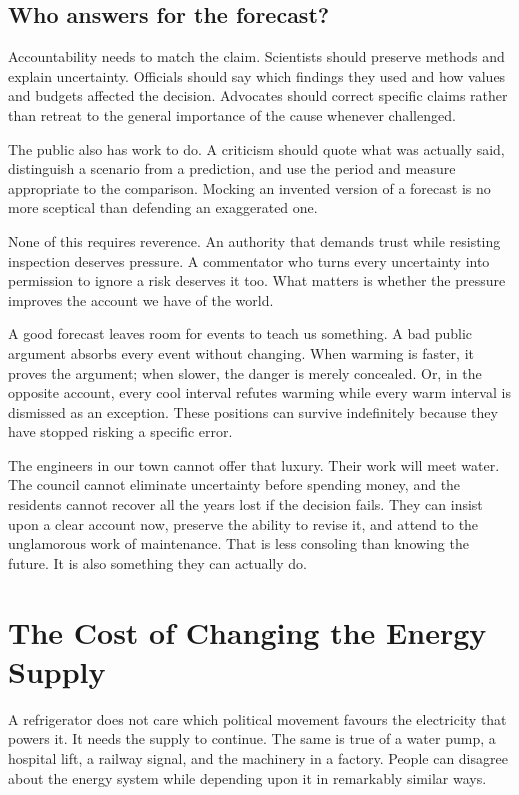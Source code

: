 \documentclass[12pt,a4paper]{book}
\begin{document}
\section*{Who answers for the forecast?}

Accountability needs to match the claim. Scientists should preserve methods and explain uncertainty. Officials should say which findings they used and how values and budgets affected the decision. Advocates should correct specific claims rather than retreat to the general importance of the cause whenever challenged.

The public also has work to do. A criticism should quote what was actually said, distinguish a scenario from a prediction, and use the period and measure appropriate to the comparison. Mocking an invented version of a forecast is no more sceptical than defending an exaggerated one.

None of this requires reverence. An authority that demands trust while resisting inspection deserves pressure. A commentator who turns every uncertainty into permission to ignore a risk deserves it too. What matters is whether the pressure improves the account we have of the world.

A good forecast leaves room for events to teach us something. A bad public argument absorbs every event without changing. When warming is faster, it proves the argument; when slower, the danger is merely concealed. Or, in the opposite account, every cool interval refutes warming while every warm interval is dismissed as an exception. These positions can survive indefinitely because they have stopped risking a specific error.

The engineers in our town cannot offer that luxury. Their work will meet water. The council cannot eliminate uncertainty before spending money, and the residents cannot recover all the years lost if the decision fails. They can insist upon a clear account now, preserve the ability to revise it, and attend to the unglamorous work of maintenance. That is less consoling than knowing the future. It is also something they can actually do.

\chapter{The Cost of Changing the Energy Supply}

A refrigerator does not care which political movement favours the electricity that powers it. It needs the supply to continue. The same is true of a water pump, a hospital lift, a railway signal, and the machinery in a factory. People can disagree about the energy system while depending upon it in remarkably similar ways.
\end{document}
